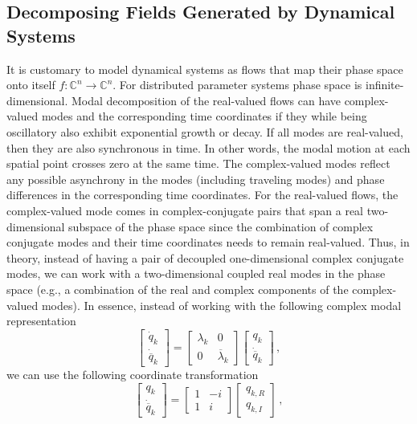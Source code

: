 \documentclass[10pt]{article}
\begin{document}
\subsection{Decomposing Fields Generated by Dynamical Systems}
It is customary to model dynamical systems as flows that map their phase space onto itself $f:\mathbb{C}^n\rightarrow \mathbb{C}^n$.
For distributed parameter systems phase space is infinite-dimensional.
Modal decomposition of the real-valued flows can have complex-valued modes and the corresponding time coordinates if they while being oscillatory also exhibit exponential growth or decay.
If all modes are real-valued, then they are also synchronous in time.
In other words, the modal motion at each spatial point crosses zero at the same time.
The complex-valued modes reflect any possible asynchrony in the modes (including traveling modes) and phase differences in the corresponding time coordinates.
For the real-valued flows, the complex-valued mode comes in complex-conjugate pairs that span a real two-dimensional subspace of the phase space since the combination of complex conjugate modes and their time coordinates needs to remain real-valued.
Thus, in theory, instead of having a pair of decoupled one-dimensional complex conjugate modes, we can work with a two-dimensional coupled real modes in the phase space (e.g., a combination of the real and complex components of the complex-valued modes).
In essence, instead of working with the following complex modal representation
\begin{equation}
    \left[
    \begin{matrix}{}
  \dot q_{k} \\
  \dot {\overline q}_{k}
  \end{matrix}
  \right]=\left[
  \begin{matrix}{}
  \lambda_k & 0 \\
  0 & \overline \lambda_k 
  \end{matrix}
\right]
  \left[
  \begin{matrix}{}
  q_{k} \\
  \dot {\overline q}_{k} 
  \end{matrix}
\right]\,,
\end{equation}
we can use the following coordinate transformation
\begin{equation}
  \left[
  \begin{matrix}{}
  q_{k} \\
  \dot {\overline q}_{k} 
  \end{matrix}
\right]=
\left[
  \begin{matrix}{}
  1 & -i \\
  1 & i 
  \end{matrix}
\right]
  \left[
  \begin{matrix}{}
  q_{k,R} \\
  q_{k,I} 
  \end{matrix}
\right]\,,
\end{equation}
\end{document}
